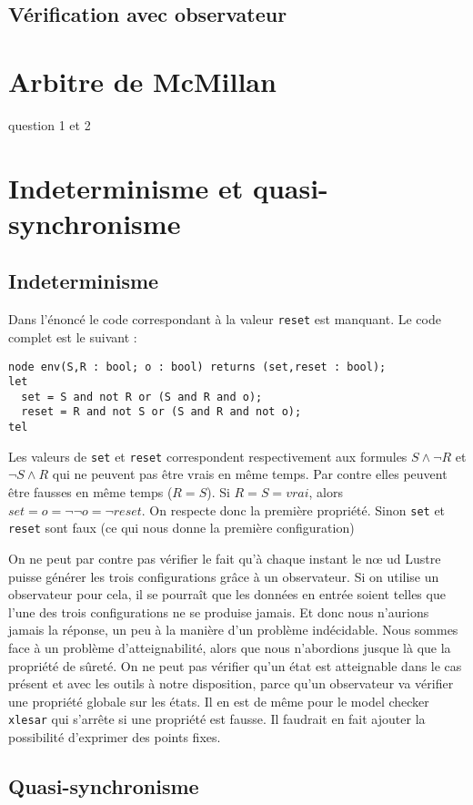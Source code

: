 \documentclass[a4paper]{article}
\begin{document}
\subsection{Vérification avec observateur}

\section{Arbitre de McMillan}
question 1 et 2
\section{Indeterminisme et quasi-synchronisme}

\subsection{Indeterminisme}

Dans l'énoncé le code correspondant à la valeur \texttt{reset} est
manquant. Le code complet est le suivant :

\begin{verbatim}
node env(S,R : bool; o : bool) returns (set,reset : bool);
let
  set = S and not R or (S and R and o);
  reset = R and not S or (S and R and not o);
tel
\end{verbatim}

Les valeurs de \texttt{set} et \texttt{reset} correspondent
respectivement aux formules $S \wedge \neg R$ et $\neg S \wedge R$ qui
ne peuvent pas être vrais en même temps. Par contre elles peuvent être
fausses en même temps ($R = S$). Si $R = S = vrai$, alors $set = o = \neg
\neg o = \neg reset$. On respecte donc la première
propriété. Sinon \texttt{set} et \texttt{reset} sont faux
(ce qui nous donne la première configuration)

On ne peut par contre pas vérifier le fait qu'à chaque instant le n\oe
ud Lustre puisse générer les trois configurations grâce à un
observateur. Si on utilise un observateur pour cela, il se pourraît que
les données en entrée soient telles que l'une des trois configurations
ne se produise jamais. Et donc nous n'aurions jamais la réponse, un
peu à la manière d'un problème indécidable. Nous sommes face à un problème
d'atteignabilité, alors que nous n'abordions jusque là que la propriété de
sûreté. On ne peut pas vérifier qu'un état est atteignable
dans le cas présent et avec les outils à notre disposition, parce
qu'un observateur va vérifier une propriété globale sur les états. Il
en est de même pour le model checker \texttt{xlesar} qui s'arrête si
une propriété est fausse. Il faudrait en fait ajouter la possibilité
d'exprimer des points fixes.

\subsection{Quasi-synchronisme}
\end{document}
